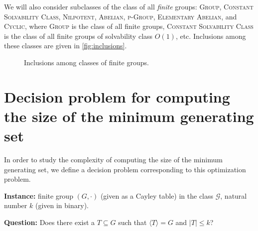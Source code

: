 \documentclass{article}
\newcommand{\gen}[1]{{\langle #1 \rangle}}
\begin{document}
We will also consider subclasses of the class of all \emph{finite} groups: \textsc{Group}, \textsc{Constant Solvability Class}, \textsc{Nilpotent}, \textsc{Abelian}, \textsc{p-Group}, \textsc{Elementary Abelian}, and \textsc{Cyclic}, where \textsc{Group} is the class of all finite groups, \textsc{Constant Solvability Class} is the class of all finite groups of solvability class $O(1)$, etc.
Inclusions among these classes are given in \autoref{fig:inclusions}.
\begin{figure}
  \caption{Inclusions among classes of finite groups.\label{fig:inclusions}}
  \begin{center}
  \end{center}
\end{figure}

\section{Decision problem for computing the size of the minimum generating set}

In order to study the complexity of computing the size of the minimum generating set, we define a decision problem corresponding to this optimization problem.

\begin{definition}
  \mbox{}

  \textbf{Instance:} finite group $(G, \cdot)$ (given as a Cayley table) in the class $\mathcal{G}$, natural number $k$ (given in binary).

  \textbf{Question:} Does there exist a $T \subseteq G$ such that $\gen{T} = G$ and $|T| \leq k$?
\end{definition}
\end{document}
